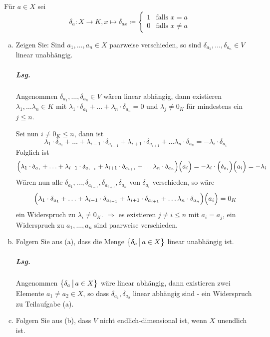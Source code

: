 \documentclass{scrreprt}
\begin{document}
Für $a \in X$ sei
\[
  \delta_a \colon X \to K, x \mapsto \delta_{ax} \coloneqq
  \begin{cases}
    1 & \text{falls } x = a \\
    0 & \text{falls } x \ne a
  \end{cases}
\]
\newpage
\begin{enumerate}[(a)]
\item Zeigen Sie: Sind $a_1, \ldots, a_n \in X$ paarweise verschieden, so sind
  $\delta_{a_1}, \ldots, \delta_{a_n} \in V$ linear unabhängig.

  \subparagraph{Lsg.} Angenommen $\delta_{a_1}, \ldots, \delta_{a_n} \in V$
  wären linear abhängig, dann existieren $\lambda_1, \ldots \lambda_n \in K$
  mit $\lambda_1 \cdot \delta_{a_1} + \ldots + \lambda_n \cdot \delta_{a_n} = 0$
  und $\lambda_j \ne 0_K$ für mindestens ein $j \leq n$.

  Sei nun $i \ne 0_K \leq n$, dann ist
  \[
    \lambda_1 \cdot \delta_{a_1} + \ldots +
    \lambda_{i - 1} \cdot \delta_{a_{i - 1}} +
    \lambda_{i + 1} \cdot \delta_{a_{i + 1}} +
    \ldots
    \lambda_n \cdot \delta_{a_n} =
    -\lambda_i \cdot \delta_{a_i}
  \]
  Folglich ist
  \[
    \qty\Big(\lambda_1 \cdot \delta_{a_1} + \ldots +
    \lambda_{i - 1} \cdot \delta_{a_{i - 1}} +
    \lambda_{i + 1} \cdot \delta_{a_{i + 1}} +
    \ldots
    \lambda_n \cdot \delta_{a_n})\qty\Big(a_i) =
    -\lambda_i \cdot \qty\Big(\delta_{a_i})\qty\Big(a_i) = -\lambda_i
  \]
  Wären nun alle
  $\delta_{a_1}, \ldots, \delta_{a_{i - 1}}, \delta_{a_{i + 1}}, \delta_{a_n}$
  von $\delta_{a_i}$ verschieden, so wäre
  \[
    \qty\Big(\lambda_1 \cdot \delta_{a_1} + \ldots +
    \lambda_{i - 1} \cdot \delta_{a_{i - 1}} +
    \lambda_{i + 1} \cdot \delta_{a_{i + 1}} +
    \ldots
    \lambda_n \cdot \delta_{a_n})\qty\Big(a_i) = 0_K
  \]
  ein Widerspruch zu $\lambda_i \ne 0_K$.
  $\Rightarrow$ es existieren $j \ne i \leq n$ mit $a_i = a_j$,
  ein Widerspruch zu $a_1, \ldots, a_n$ sind paarweise verschieden.

\item Folgern Sie aus (a), dass die Menge
  $\qty\big{\delta_a \, {\big |} \, a \in X}$ linear unabhängig ist.

  \subparagraph{Lsg.} Angenommen  $\qty\big{\delta_a \, {\big |} \, a \in X}$
  wäre linear abhängig, dann existieren zwei Elemente $a_1 \ne a_2 \in X$, so dass
  $\delta_{a_1}, \delta_{a_2}$ linear abhängig sind - ein Widerspruch zu
  Teilaufgabe (a).

\item Folgern Sie aus (b), dass $V$ nicht endlich-dimensional ist, wenn
  $X$ unendlich ist.


\end{enumerate}
\end{document}
